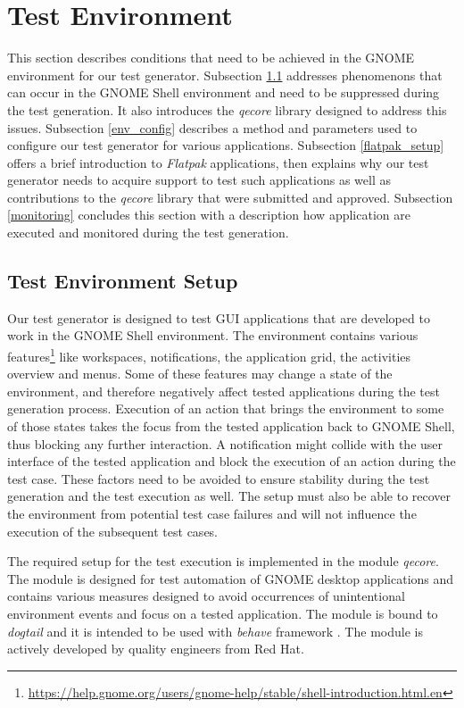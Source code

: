 \section{Test Environment}\label{test_env}

This section describes conditions that need to be achieved in the GNOME environment for our test generator. Subsection \ref{test_ev_setup} addresses phenomenons that can occur in the GNOME Shell environment and need to be suppressed during the test generation. It also introduces the \textit{qecore} library designed to address this issues. Subsection \ref{env_config} describes a method and parameters used to configure our test generator for various applications. Subsection \ref{flatpak_setup} offers a brief introduction to \emph{Flatpak} applications, then explains why our test generator needs to acquire support to test such applications as well as contributions to the \textit{qecore} library that were submitted and approved. Subsection \ref{monitoring} concludes this section with a description how application are executed and monitored during the test generation. 

\subsection{Test Environment Setup}\label{test_ev_setup}

Our test generator is designed to test GUI applications that are developed to work in the GNOME Shell environment. The environment contains various features\footnote{\url{https://help.gnome.org/users/gnome-help/stable/shell-introduction.html.en}} like workspaces, notifications, the application grid, the activities overview and menus. Some of these features may change a state of the environment, and therefore negatively affect tested applications during the test generation process. Execution of an action that brings the environment to some of those states takes the focus from the tested application back to GNOME Shell, thus blocking any further interaction. A notification might collide with the user interface of the tested application and block the execution of an action during the test case. These factors need to be avoided to ensure stability during the test generation and the test execution as well. The setup must also be able to recover the environment from potential test case failures and will not influence the execution of the subsequent test cases. 

The required setup for the test execution is implemented in the module \textit{qecore}. The module is designed for test automation of GNOME desktop applications and contains various measures designed to avoid occurrences of unintentional environment events and focus on a tested application. The module is bound to \textit{dogtail} and it is intended to be used with \textit{behave} framework \cite{qecore}. The module is actively developed by quality engineers from Red Hat.

